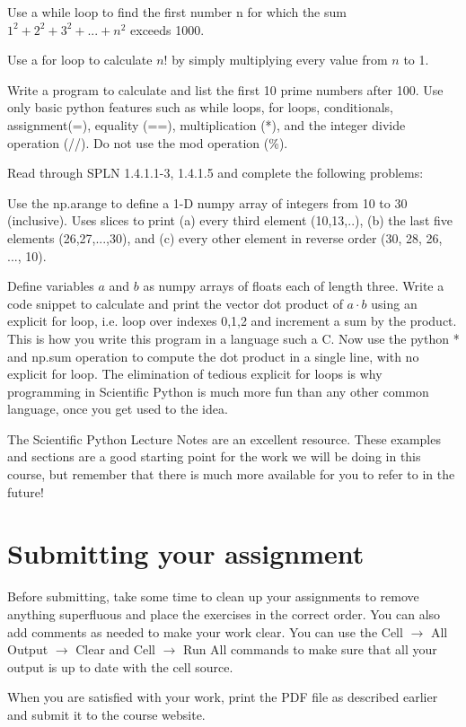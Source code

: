 \begin{plot}
Use a while loop to find the first number n for which the sum $1^2+2^2+3^2+...+n^2$ exceeds 1000.
\end{plot}

\begin{plot}
Use a for loop to calculate $n!$ by simply multiplying every value from $n$ to 1.
\end{plot}

\begin{plot}
Write a program to calculate and list the first 10 prime numbers after
100.  Use only basic python features such as while loops, for loops,
conditionals, assignment(=), equality (==), multiplication (*), and
the integer divide operation (//).  Do not use the mod operation (\%).
\end{plot}

Read through SPLN 1.4.1.1-3, 1.4.1.5 and complete the following problems:

\begin{plot}
Use the np.arange to define a 1-D numpy array of integers from 10 to
30 (inclusive).  Uses slices to print (a) every third element
(10,13,..), (b) the last five elements (26,27,...,30), and (c) every
other element in reverse order (30, 28, 26, ..., 10).
\end{plot}

\begin{plot}
Define variables $a$ and $b$ as numpy arrays of floats each of length
three.  Write a code snippet to calculate and print the vector dot
product of $a \cdot b$ using an explicit for loop, i.e. loop over
indexes 0,1,2 and increment a sum by the product.  This is how you
write this program in a language such a C.  Now use the python * and
np.sum operation to compute the dot product in a single line, with no
explicit for loop.  The elimination of tedious explicit for loops is
why programming in Scientific Python is much more fun than any other
common language, once you get used to the idea.
\end{plot}

The Scientific Python Lecture Notes are an excellent resource.  These
examples and sections are a good starting point for the work we will
be doing in this course, but remember that there is much more
available for you to refer to in the future!

\section{Submitting your assignment}

Before submitting, take some time to clean up your assignments to
remove anything superfluous and place the exercises in the correct
order.  You can also add comments as needed to make your work clear.
You can use the Cell $\to$ All Output $\to$ Clear and Cell $\to$ Run
All commands to make sure that all your output is up to date with the
cell source.

When you are satisfied with your work, print the PDF file as described
earlier and submit it to the course website.

